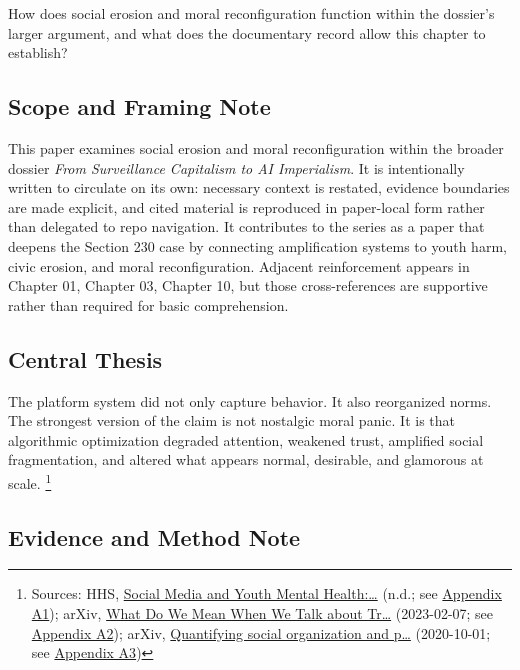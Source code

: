 \documentclass[
  american,
  11pt,
  letterpaper,
]{article}
\begin{document}
How does social erosion and moral reconfiguration function within the
dossier's larger argument, and what does the documentary record allow
this chapter to establish?

\subsection{Scope and Framing Note}\label{scope-and-framing-note-2}

This paper examines social erosion and moral reconfiguration within the
broader dossier \emph{From Surveillance Capitalism to AI Imperialism}.
It is intentionally written to circulate on its own: necessary context
is restated, evidence boundaries are made explicit, and cited material
is reproduced in paper-local form rather than delegated to repo
navigation. It contributes to the series as a paper that deepens the
Section 230 case by connecting amplification systems to youth harm,
civic erosion, and moral reconfiguration. Adjacent reinforcement appears
in Chapter 01, Chapter 03, Chapter 10, but those cross-references are
supportive rather than required for basic comprehension.

\subsection{Central Thesis}\label{central-thesis-2}

The platform system did not only capture behavior. It also reorganized
norms. The strongest version of the claim is not nostalgic moral panic.
It is that algorithmic optimization degraded attention, weakened trust,
amplified social fragmentation, and altered what appears normal,
desirable, and glamorous at scale. \footnote{Sources: HHS,
  \href{https://www.hhs.gov/surgeongeneral/priorities/youth-mental-health/social-media/index.html}{Social
  Media and Youth Mental Health:\ldots{}} (n.d.; see
  \hyperref[ch-02-appendix-a1-social-media-and-youth-mental-health-the-u-s-surgeon-general-s-advisory]{Appendix
  A1}); arXiv, \href{https://arxiv.org/abs/2302.03671}{What Do We Mean
  When We Talk about Tr\ldots{}} (2023-02-07; see
  \hyperref[ch-02-appendix-a2-what-do-we-mean-when-we-talk-about-trust-in-social-media-a-systematic-review]{Appendix
  A2}); arXiv, \href{https://arxiv.org/abs/2010.00590}{Quantifying
  social organization and p\ldots{}} (2020-10-01; see
  \hyperref[ch-02-appendix-a3-quantifying-social-organization-and-political-polarization-in-online-platforms]{Appendix
  A3})}

\subsection{Evidence and Method Note}\label{evidence-and-method-note-2}
\end{document}
